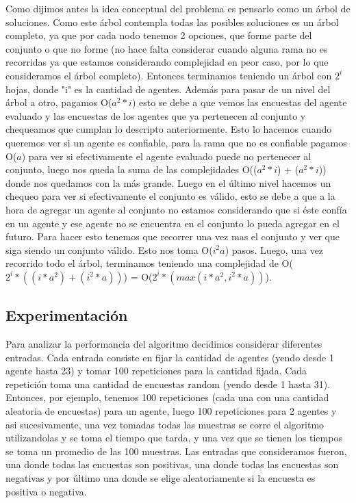 	Como dijimos antes la idea conceptual del problema es pensarlo como un árbol de soluciones. Como este árbol contempla todas las posibles soluciones es un árbol completo, ya que por cada nodo tenemos 2 opciones, que forme parte del conjunto o que no forme (no hace falta considerar cuando alguna rama no es recorridas ya que estamos considerando complejidad en peor caso, por lo que  consideramos el árbol completo). Entonces terminamos teniendo un árbol con $2^{i}$ hojas, donde "i" es la cantidad de agentes. Además para pasar de un nivel del árbol a otro, pagamos O($a^{2}*i$) esto se debe a que vemos las encuestas del agente evaluado y las encuestas de los agentes que ya pertenecen al conjunto y chequeamos que cumplan lo descripto anteriormente. Esto lo hacemos cuando queremos ver si un agente es confiable, para la rama que no es confiable pagamos O($a$) para ver si efectivamente el agente evaluado puede no pertenecer al conjunto, luego nos queda la suma de las complejidades O(($a^{2}*i$) + ($a^{2}*i$)) donde nos quedamos con la más grande. Luego en el último nivel hacemos un chequeo para ver si efectivamente el conjunto es válido, esto se debe a que a la hora de agregar un agente al conjunto no estamos considerando que si éste confía en un agente y ese agente no se encuentra en el conjunto lo pueda agregar en el futuro. Para hacer esto tenemos que recorrer una vez mas el conjunto y ver que siga siendo un conjunto válido. Esto nos toma O($i^{2}a$) pasos. Luego, una vez recorrido todo el árbol, terminamos teniendo una complejidad de O($2^{i}*((i*a^{2})+(i^{2}*a))$) = O($2^{i}*(max(i*a^{2}, i^{2}*a))$).
	
\subsection{Experimentación} 
	
	Para analizar la performancia del algoritmo decidimos considerar diferentes entradas. Cada entrada consiste en fijar la cantidad de agentes (yendo desde 1 agente hasta 23) y tomar 100 repeticiones para la cantidad fijada. Cada repetición toma una cantidad de encuestas random (yendo desde 1 hasta 31). Entonces, por ejemplo, tenemos 100 repeticiones (cada una con una cantidad aleatoria de encuestas) para un agente, luego 100 repeticiones para 2 agentes y asi sucesivamente, una vez tomadas todas las muestras se corre el algoritmo utilizandolas y se toma el tiempo que tarda, y una vez que se tienen los tiempos se toma un promedio de las 100 muestras. Las entradas que consideramos fueron, una donde todas las encuestas son positivas, una donde todas las encuestas son negativas y por último una donde se elige aleatoriamente si la encuesta es positiva o negativa.       
	
